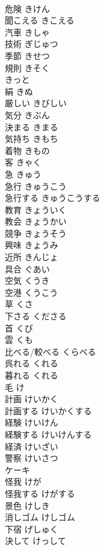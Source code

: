 \documentclass[8pt]{extreport}
\begin{document}
\begin{CJK}{UTF8}{min}
\\	危険	きけん	
\\	聞こえる	きこえる	
\\	汽車	きしゃ	
\\	技術	ぎじゅつ	
\\	季節	きせつ	
\\	規則	きそく	
\\	きっと		
\\	絹	きぬ	
\\	厳しい	きびしい	
\\	気分	きぶん	
\\	決まる	きまる	
\\	気持ち	きもち	
\\	着物	きもの	
\\	客	きゃく	
\\	急	きゅう	
\\	急行	きゅうこう	
\\	急行する	きゅうこうする	
\\	教育	きょういく	
\\	教会	きょうかい	
\\	競争	きょうそう	
\\	興味	きょうみ	
\\	近所	きんじょ	
\\	具合	ぐあい	
\\	空気	くうき	
\\	空港	くうこう	
\\	草	くさ	
\\	下さる	くださる	
\\	首	くび	
\\	雲	くも	
\\	比べる/較べる	くらべる	
\\	呉れる	くれる	
\\	暮れる	くれる	
\\	毛	け	
\\	計画	けいかく	
\\	計画する	けいかくする	
\\	経験	けいけん	
\\	経験する	けいけんする	
\\	経済	けいざい	
\\	警察	けいさつ	
\\	ケーキ		
\\	怪我	けが	
\\	怪我する	けがする	
\\	景色	けしき	
\\	消しゴム	けしゴム	
\\	下宿	げしゅく	
\\	決して	けっして	

\end{CJK}
\end{document}
